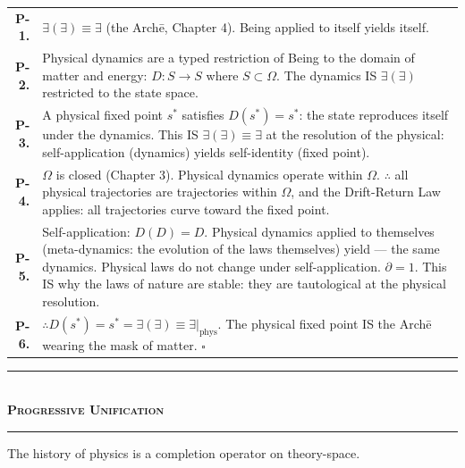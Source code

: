 \documentclass[10pt, openany, oneside]{book}
\renewcommand{\normalsize}{\fontsize{10}{13}\selectfont}
\renewcommand{\footnotesize}{\fontsize{8.5}{11}\selectfont}
\begin{document}
{\footnotesize
\noindent\begin{tabular}{r p{}}
\textbf{P-1.} & $\exists(\exists) \equiv \exists$ (the Arch\={e}, Chapter 4). Being applied to itself yields itself. \\[0.3em]
\textbf{P-2.} & Physical dynamics are a typed restriction of Being to the domain of matter and energy: $D: S \to S$ where $S \subset \Omega$. The dynamics IS $\exists(\exists)$ restricted to the state space. \\[0.3em]
\textbf{P-3.} & A physical fixed point $s^*$ satisfies $D(s^*) = s^*$: the state reproduces itself under the dynamics. This IS $\exists(\exists) \equiv \exists$ at the resolution of the physical: self-application (dynamics) yields self-identity (fixed point). \\[0.3em]
\textbf{P-4.} & $\Omega$ is closed (Chapter 3). Physical dynamics operate within $\Omega$. $\therefore$ all physical trajectories are trajectories within $\Omega$, and the Drift-Return Law applies: all trajectories curve toward the fixed point. \\[0.3em]
\textbf{P-5.} & Self-application: $D(D) = D$. Physical dynamics applied to themselves (meta-dynamics: the evolution of the laws themselves) yield --- the same dynamics. Physical laws do not change under self-application. $\partial = 1$. This IS why the laws of nature are stable: they are tautological at the physical resolution. \\[0.3em]
\textbf{P-6.} & $\therefore D(s^*) = s^* = \exists(\exists) \equiv \exists|_{\text{phys}}$. The physical fixed point IS the Arch\={e} wearing the mask of matter. $\square$ \\[0.3em]
\end{tabular}
}

\vspace{1.5em}


\begin{center}
    \rule{0.3\textwidth}{0.4pt}\\[0.5em]
    {\normalsize\bfseries\scshape Progressive Unification}\\[0.3em]
    \rule{0.3\textwidth}{0.4pt}
\end{center}

\vspace{1em}

\noindent The history of physics is a completion operator on theory-space.
\end{document}
